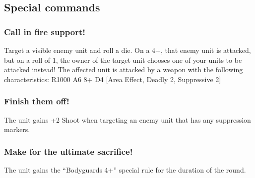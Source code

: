 \documentclass[landscape]{extarticle}
\begin{document}
\subsection*{Special commands}

\subsubsection*{Call in fire support!} Target a visible enemy unit and roll a die. On a 4+, that enemy unit is attacked, but on a roll of 1, the owner of the target unit chooses one of your units to be attacked instead! The affected unit is attacked by a weapon with the following characteristics: R1000 A6 8+ D4 [Area Effect, Deadly 2, Suppressive 2]

\subsubsection*{Finish them off!} The unit gains +2 Shoot when targeting an enemy unit that has any suppression markers.

\subsubsection*{Make for the ultimate sacrifice!} The unit gains the “Bodyguards 4+” special rule for the duration of the round.



\pagebreak
\end{document}
